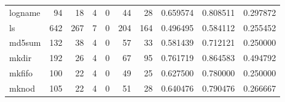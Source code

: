 \begin{tabular}{lrrrrrrrrr}
logname   &                                                 94 &                                                 18 &                                                  4 &                                                  0 &                                                 44 &                                                 28 &                                           0.659574 &                               0.808511 &                             0.297872 \\
ls        &                                                642 &                                                267 &                                                  7 &                                                  0 &                                                204 &                                                164 &                                           0.496495 &                               0.584112 &                             0.255452 \\
md5sum    &                                                132 &                                                 38 &                                                  4 &                                                  0 &                                                 57 &                                                 33 &                                           0.581439 &                               0.712121 &                             0.250000 \\
mkdir     &                                                192 &                                                 26 &                                                  4 &                                                  0 &                                                 67 &                                                 95 &                                           0.761719 &                               0.864583 &                             0.494792 \\
mkfifo    &                                                100 &                                                 22 &                                                  4 &                                                  0 &                                                 49 &                                                 25 &                                           0.627500 &                               0.780000 &                             0.250000 \\
mknod     &                                                105 &                                                 22 &                                                  4 &                                                  0 &                                                 51 &                                                 28 &                                           0.640476 &                               0.790476 &                             0.266667 \\

\end{tabular}
